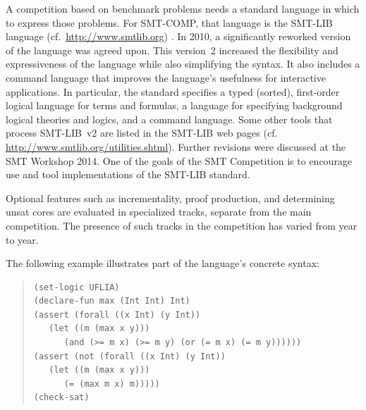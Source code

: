 \documentclass[twoside,11pt]{article}
\begin{document}
A competition based on benchmark problems needs a standard language in which to express those problems.
For SMT-COMP, that language is the SMT-LIB language (cf.~\url{http://www.smtlib.org}) \cite{BarST-RR-10,BarST-SMT-10,Cok-SMTLIBTutorial-2011}.
In 2010, a significantly reworked version of the language was agreed upon.
This version~2 increased the flexibility and expressiveness of the language while also simplifying the syntax.
It also includes a command language that improves the language's usefulness for interactive applications.
In particular, the standard specifies a typed (sorted), first-order logical language for terms and formulas, a language for specifying background logical theories and logics, and a command language. Some other tools that process SMT-LIB~v2 are listed in the SMT-LIB web pages (cf. \url{http://www.smtlib.org/utilities.shtml}). Further revisions were discussed at the SMT Workshop 2014. One of the goals of the SMT Competition is to encourage use and tool implementations of the SMT-LIB standard.

Optional features such as incrementality, proof production, and determining unsat cores are evaluated in specialized tracks, separate from the main competition. The presence of such tracks in the competition has varied from year to year.
  
The following example illustrates part of the language's concrete syntax:

\begin{minipage}{\textwidth}
\begin{quote}
\lstset{frameround=fttt}
\begin{lstlisting}[frame=trBL]
(set-logic UFLIA)
(declare-fun max (Int Int) Int)
(assert (forall ((x Int) (y Int))
   (let ((m (max x y)))
      (and (>= m x) (>= m y) (or (= m x) (= m y))))))
(assert (not (forall ((x Int) (y Int))
   (let ((m (max x y)))
      (= (max m x) m)))))
(check-sat)
\end{lstlisting}
\end{quote}
\end{minipage}
\end{document}
